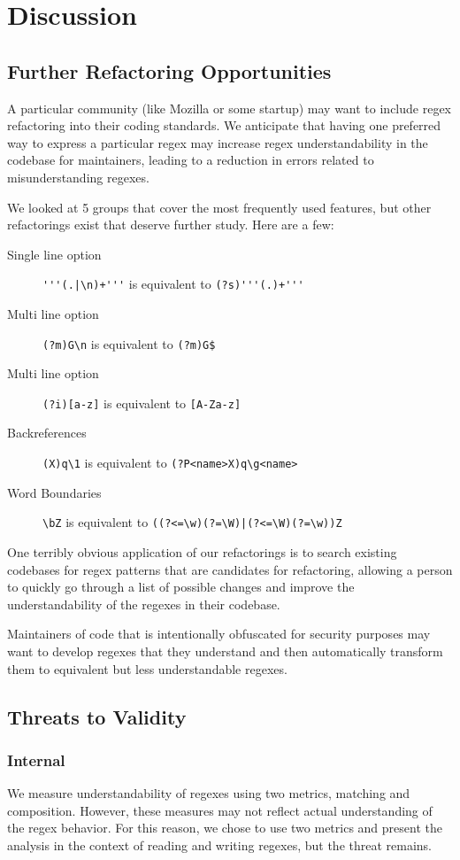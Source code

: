 \section{Discussion}
\label{sec:discussion}

\subsection{Further Refactoring Opportunities}
A particular community (like Mozilla or some startup) may want to include regex refactoring into their coding standards.  We anticipate that having one preferred way to express a particular regex may increase regex understandability in the codebase for maintainers, leading to a reduction in errors related to misunderstanding regexes.

We looked at 5 groups that cover the most frequently used features, but other refactorings exist that deserve further study.  Here are a few:
\begin{description}
\item[Single line option]  \verb!'''(.|\n)+'''! is equivalent to \verb!(?s)'''(.)+'''!
\item[Multi line option]  \verb!(?m)G\n! is equivalent to \verb!(?m)G$!
\item[Multi line option]  \verb!(?i)[a-z]! is equivalent to \verb![A-Za-z]!
\item[Backreferences]  \verb!(X)q\1! is equivalent to \verb!(?P<name>X)q\g<name>!
\item[Word Boundaries]  \verb!\bZ! is equivalent to \verb!((?<=\w)(?=\W)|(?<=\W)(?=\w))Z!
\end{description}

One terribly obvious application of our refactorings is to search existing codebases for regex patterns that are candidates for refactoring, allowing a person to quickly go through a list of possible changes and improve the understandability of the regexes in their codebase.

Maintainers of code that is intentionally obfuscated for security purposes may want to develop regexes that they understand and then automatically transform them to equivalent but less understandable regexes.



\subsection{Threats to Validity}

\subsubsection{Internal}
We measure understandability of regexes using two metrics, matching and composition. However, these measures may not reflect actual understanding of the regex behavior. For this reason, we chose to use two metrics and present the analysis in the context of reading and writing regexes, but the threat remains.

